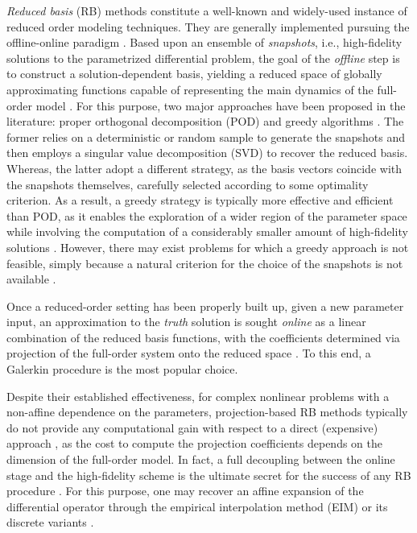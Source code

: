 \documentclass[12pt, a4paper, twoside, openright, notitlepage]{report}
\numberwithin{equation}{chapter}
\theoremstyle{theorem}
\theoremstyle{definition}
\theoremstyle{remark}
\theoremstyle{proposition}
\numberwithin{figure}{chapter}
\begin{document}
		\emph{Reduced basis} (RB) methods constitute a well-known and widely-used instance of reduced order modeling techniques. They are generally implemented pursuing the offline-online paradigm \cite{Mad06}. Based upon an ensemble of \emph{snapshots}, i.e., high-fidelity solutions to the parametrized differential problem, the goal of the \emph{offline} step is to construct a solution-dependent basis, yielding a reduced space of globally approximating functions capable of representing the main dynamics of the full-order model \cite{Bal14, Chen17}. For this purpose, two major approaches have been proposed in the literature: proper orthogonal decomposition (POD) \cite{Vol08} and greedy algorithms \cite{HSZ14}. The former relies on a deterministic or random sample to generate the snapshots and then employs a singular value decomposition (SVD) to recover the reduced basis. Whereas, the latter adopt a different strategy, as the basis vectors coincide with the snapshots themselves, carefully selected according to some optimality criterion. As a result, a greedy strategy is typically more effective and efficient than POD, as it enables the exploration of a wider region of the parameter space while involving the computation of a considerably smaller amount of high-fidelity solutions \cite{HSR16}. However, there may exist problems for which a greedy approach is not feasible, simply because a natural criterion for the choice of the snapshots is not available \cite{Bal14}. %
		
		Once a reduced-order setting has been properly built up, given a new parameter input, an approximation to the \emph{truth} solution is sought \emph{online} as a linear combination of the reduced basis functions, with the coefficients determined via projection of the full-order system onto the reduced space \cite{Buf12}. To this end, a Galerkin procedure is the most popular choice. 
		
		Despite their established effectiveness, for complex nonlinear problems with a non-affine dependence on the parameters, projection-based RB methods typically do not provide any computational gain with respect to a direct (expensive) approach 	, as the cost to compute the projection coefficients depends on the dimension of the full-order model. In fact, a full decoupling between the online stage and the high-fidelity scheme is the ultimate secret for the success of any RB procedure \cite{QMN15}. For this purpose, one may recover an affine expansion of the differential operator through the empirical interpolation method (EIM) \cite{Bar04} or its discrete variants \cite{Cha10, NMA15}. 
		
\end{document}
